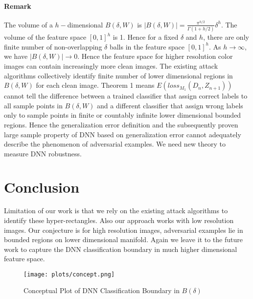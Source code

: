 \documentclass[12pt]{article}
\begin{document}
\paragraph{Remark} The volume of a $h-$dimensional $B(\delta,W)$ is
$|B(\delta,W)|=\frac{\pi^{h/2}}{\Gamma(1+h/2)} \delta^h$. The volume
of the feature space $[0,1]^h$ is 1. Hence for a fixed
$\delta$ and $h$, there are only finite
number of non-overlapping $\delta$ balls in the feature space
$[0,1]^h$. As $h \longrightarrow \infty$, we have $|B(\delta,W)|
\longrightarrow 0$. Hence the feature space for higher resolution color
images can contain increasingly more clean images. The existing attack
algorithms collectively identify finite number of lower dimensional
regions in $B(\delta,W)$ for each clean image. Theorem 1 means
$E(loss_{M_1}(D_n,Z_{n+1}))$ cannot tell the difference between a
trained classifier that assign correct labels to all sample points in
$B(\delta,W)$ and a different classifier that assign wrong labels only
to sample points in 
finite or countably infinite lower dimensional bounded regions. Hence
the generalization error definition and the subsequently proven large
sample property of DNN based 
on generalization error cannot adequately describe the phenomenon of
adversarial examples. We need new theory to measure DNN robustness.  



%
\section{Conclusion}
\label{sec:conclusion}

Limitation of our work is that we rely on the existing attack
algorithms to identify these hyper-rectangles. Also our approach works
with low resolution  images. Our conjecture
is for high resolution images, adversarial examples lie in bounded
regions on lower dimensional manifold. Again we leave it to the future
work to capture the DNN classification boundary in much higher
dimensional feature space. 

\begin{figure}[h!]
\centering
\texttt{[image: plots/concept.png]}
\caption{Conceptual Plot of DNN Classification Boundary in $B(\delta)$}
\label{fig:concept}       
\end{figure}
\end{document}
